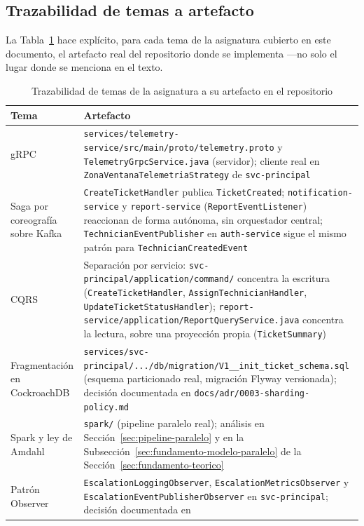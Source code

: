 \subsection{Trazabilidad de temas a artefacto}
\label{sec:trazabilidad-temas}

La Tabla~\ref{tab:trazabilidad-temas} hace explícito, para cada tema de la asignatura cubierto en
este documento, el artefacto real del repositorio donde se implementa —no solo el lugar donde se
menciona en el texto.

\begin{table}[H]
\centering
\caption{Trazabilidad de temas de la asignatura a su artefacto en el repositorio}
\label{tab:trazabilidad-temas}
\small
\begin{tabular}{@{}p{3.1cm}p{9.4cm}@{}}
\toprule
\textbf{Tema} & \textbf{Artefacto} \\
\midrule
gRPC &
  \texttt{services/telemetry-service/src/main/proto/telemetry.proto} y
  \texttt{TelemetryGrpcService.java} (servidor); cliente real en
  \texttt{ZonaVentanaTelemetriaStrategy} de \texttt{svc-principal} \\
Saga por coreografía sobre Kafka &
  \texttt{CreateTicketHandler} publica \texttt{TicketCreated}; \texttt{notification-service} y
  \texttt{report-service} (\texttt{ReportEventListener}) reaccionan de forma autónoma, sin
  orquestador central; \texttt{TechnicianEventPublisher} en \texttt{auth-service} sigue el mismo
  patrón para \texttt{TechnicianCreatedEvent} \\
CQRS &
  Separación por servicio: \texttt{svc-principal/application/command/} concentra la escritura
  (\texttt{CreateTicketHandler}, \texttt{AssignTechnicianHandler},
  \texttt{UpdateTicketStatusHandler}); \texttt{report-service/application/ReportQueryService.java}
  concentra la lectura, sobre una proyección propia (\texttt{TicketSummary}) \\
Fragmentación en CockroachDB &
  \texttt{services/svc-principal/.../db/migration/V1\_\_init\_ticket\_schema.sql} (esquema
  particionado real, migración Flyway versionada); decisión documentada en
  \texttt{docs/adr/0003-sharding-policy.md} \\
Spark y ley de Amdahl &
  \texttt{spark/} (pipeline paralelo real); análisis en
  Sección~\ref{sec:pipeline-paralelo} y en la Subsección~\ref{sec:fundamento-modelo-paralelo} de
  la Sección~\ref{sec:fundamento-teorico} \\
Patrón Observer &
  \texttt{EscalationLoggingObserver}, \texttt{EscalationMetricsObserver} y
  \texttt{EscalationEventPublisherObserver} en \texttt{svc-principal}; decisión documentada en

\end{tabular}
\end{table}
